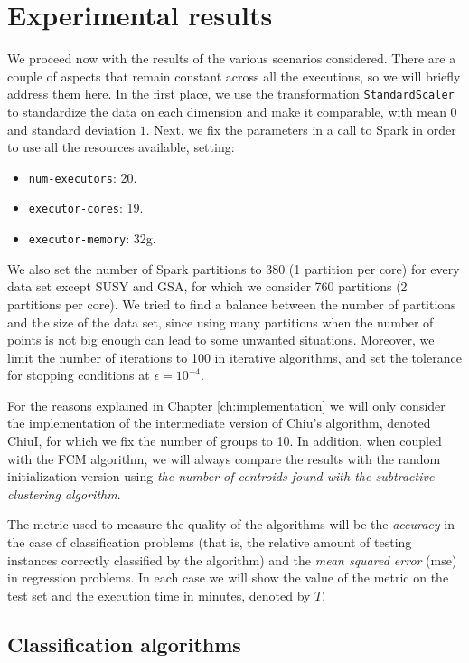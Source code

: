 \section{Experimental results}

We proceed now with the results of the various scenarios considered. There are a couple of aspects that remain constant across all the executions, so we will briefly address them here. In the first place, we use the transformation \verb|StandardScaler| to standardize the data on each dimension and make it comparable, with mean $0$ and standard deviation $1$. Next, we fix the parameters in a call to Spark in order to use all the resources available, setting:

\begin{itemize}
  \item \verb|num-executors|: 20.
  \item \verb|executor-cores|: 19.
  \item \verb|executor-memory|: 32g.
\end{itemize}
We also set the number of Spark partitions to 380 (1 partition per core) for every data set except SUSY and GSA, for which we consider 760 partitions (2 partitions per core). We tried to find a balance between the number of partitions and the size of the data set, since using many partitions when the number of points is not big enough can lead to some unwanted situations. Moreover, we limit the number of iterations to 100 in iterative algorithms, and set the tolerance for stopping conditions at $\epsilon=10^{-4}$.

For the reasons explained in Chapter \ref{ch:implementation} we will only consider the implementation of the intermediate version of Chiu's algorithm, denoted ChiuI, for which we fix the number of groups to 10. In addition, when coupled with the FCM algorithm, we will always compare the results with the random initialization version using \textit{the number of centroids found with the subtractive clustering algorithm}.

The metric used to measure the quality of the algorithms will be the \textit{accuracy} in the case of classification problems (that is, the relative amount of testing instances correctly classified by the algorithm) and the \textit{mean squared error} (\acrshort{mse}) in regression problems. In each case we will show the value of the metric on the test set and the execution time in minutes, denoted by $T$.

\subsection{Classification algorithms}

